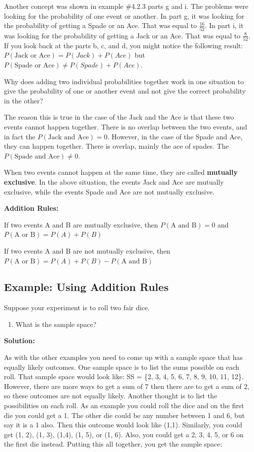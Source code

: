 \documentclass[
]{book}
\providecommand{\tightlist}{%
  \setlength{\itemsep}{0pt}\setlength{\parskip}{0pt}}
\begin{document}
Another concept was shown in example \#4.2.3 parts g and i. The problems were looking for the probability of one event or another. In part g, it was looking for the probability of getting a Spade or an Ace. That was equal to \(\frac{16}{52}\). In part i, it was looking for the probability of getting a Jack or an Ace. That was equal to \(\frac{8}{52}\). If you look back at the parts b, c, and d, you might notice the following result: \(P(\text{Jack or Ace})=P(Jack)+P(Ace)\) but \(P(\text{Spade or Ace})\ne P(Spade)+P(Ace)\).

Why does adding two individual probabilities together work in one situation to give the probability of one or another event and not give the correct probability in the other?

The reason this is true in the case of the Jack and the Ace is that these two events cannot happen together. There is no overlap between the two events, and in fact the \(P(\text{Jack and Ace})=0\). However, in the case of the Spade and Ace, they can happen together. There is overlap, mainly the ace of spades. The \(P(\text{Spade and Ace})\ne0\).

When two events cannot happen at the same time, they are called \textbf{mutually exclusive}. In the above situation, the events Jack and Ace are mutually exclusive, while the events Spade and Ace are not mutually exclusive.

\textbf{Addition Rules:}

If two events A and B are mutually exclusive, then \(P(\text{A and B})=0\) and \(P(\text{A or B})=P(A)+P(B)\)

If two events A and B are not mutually exclusive, then \(P(\text{A or B})=P(A)+P(B)-P(\text{A and B})\)

\hypertarget{example-using-addition-rules}{%
\subsection{Example: Using Addition Rules}\label{example-using-addition-rules}}

Suppose your experiment is to roll two fair dice.

\begin{enumerate}
\def\labelenumi{\alph{enumi}.}
\tightlist
\item
  What is the sample space?
\end{enumerate}

\textbf{Solution:}

As with the other examples you need to come up with a sample space that has equally likely outcomes. One sample space is to list the sums possible on each roll. That sample space would look like: SS = \{2, 3, 4, 5, 6, 7, 8, 9, 10, 11, 12\}. However, there are more ways to get a sum of 7 then there are to get a sum of 2, so these outcomes are not equally likely. Another thought is to list the possibilities on each roll. As an example you could roll the dice and on the first die you could get a 1. The other die could be any number between 1 and 6, but say it is a 1 also. Then this outcome would look like (1,1). Similarly, you could get (1, 2), (1, 3), (1,4), (1, 5), or (1, 6). Also, you could get a 2, 3, 4, 5, or 6 on the first die instead. Putting this all together, you get the sample space:
\end{document}
